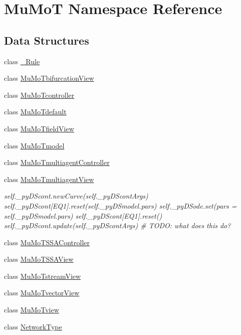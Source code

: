 \hypertarget{namespace_mu_mo_t}{}\section{Mu\+MoT Namespace Reference}
\label{namespace_mu_mo_t}
\subsection*{Data Structures}
\begin{DoxyCompactItemize}
\item 
class \hyperlink{class_mu_mo_t_1_1___rule}{\+\_\+\+Rule}
\item 
class \hyperlink{class_mu_mo_t_1_1_mu_mo_tbifurcation_view}{Mu\+Mo\+Tbifurcation\+View}
\item 
class \hyperlink{class_mu_mo_t_1_1_mu_mo_tcontroller}{Mu\+Mo\+Tcontroller}
\item 
class \hyperlink{class_mu_mo_t_1_1_mu_mo_tdefault}{Mu\+Mo\+Tdefault}
\item 
class \hyperlink{class_mu_mo_t_1_1_mu_mo_tfield_view}{Mu\+Mo\+Tfield\+View}
\item 
class \hyperlink{class_mu_mo_t_1_1_mu_mo_tmodel}{Mu\+Mo\+Tmodel}
\item 
class \hyperlink{class_mu_mo_t_1_1_mu_mo_tmultiagent_controller}{Mu\+Mo\+Tmultiagent\+Controller}
\item 
class \hyperlink{class_mu_mo_t_1_1_mu_mo_tmultiagent_view}{Mu\+Mo\+Tmultiagent\+View}
\begin{DoxyCompactList}\small\item\em self.\+\_\+py\+D\+Scont.\+new\+Curve(self.\+\_\+py\+D\+Scont\+Args) self.\+\_\+py\+D\+Scont\mbox{[}\textquotesingle{}E\+Q1\textquotesingle{}\mbox{]}.reset(self.\+\_\+py\+D\+Smodel.\+pars) self.\+\_\+py\+D\+Sode.\+set(pars = self.\+\_\+py\+D\+Smodel.\+pars) self.\+\_\+py\+D\+Scont\mbox{[}\textquotesingle{}E\+Q1\textquotesingle{}\mbox{]}.reset() self.\+\_\+py\+D\+Scont.\+update(self.\+\_\+py\+D\+Scont\+Args) \# T\+O\+DO\+: what does this do? \end{DoxyCompactList}\item 
class \hyperlink{class_mu_mo_t_1_1_mu_mo_t_s_s_a_controller}{Mu\+Mo\+T\+S\+S\+A\+Controller}
\item 
class \hyperlink{class_mu_mo_t_1_1_mu_mo_t_s_s_a_view}{Mu\+Mo\+T\+S\+S\+A\+View}
\item 
class \hyperlink{class_mu_mo_t_1_1_mu_mo_tstream_view}{Mu\+Mo\+Tstream\+View}
\item 
class \hyperlink{class_mu_mo_t_1_1_mu_mo_tvector_view}{Mu\+Mo\+Tvector\+View}
\item 
class \hyperlink{class_mu_mo_t_1_1_mu_mo_tview}{Mu\+Mo\+Tview}
\item 
class \hyperlink{class_mu_mo_t_1_1_network_type}{Network\+Type}
\end{DoxyCompactItemize}
